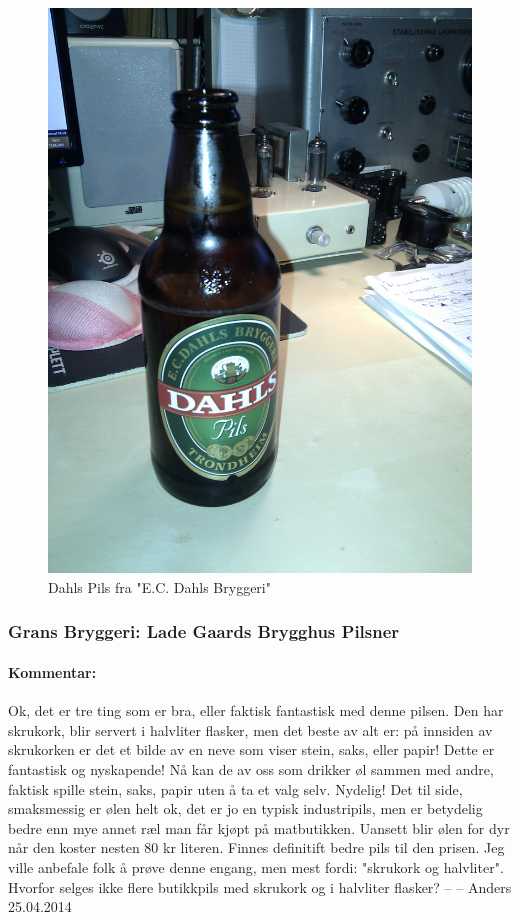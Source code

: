 \documentclass[12pt,a4paper,oneside,norsk]{article}
\begin{document}
\begin{figure} [H]
\centering
\includegraphics[scale=0.1, angle=0]{Bilder/Ol/dahls.jpg}
\caption{Dahls Pils fra "E.C. Dahls Bryggeri"}
\end{figure}

\newpage
\subsubsection{Grans Bryggeri: Lade Gaards Brygghus Pilsner}
\paragraph{Kommentar:}Ok, det er tre ting som er bra, eller faktisk fantastisk med denne pilsen. Den har skrukork, blir servert i halvliter flasker, men det beste av alt er: på innsiden av skrukorken er det et bilde av en neve som viser stein, saks, eller papir! Dette er fantastisk og nyskapende! Nå kan de av oss som drikker øl sammen med andre, faktisk spille stein, saks, papir uten å ta et valg selv. Nydelig! Det til side, smaksmessig er ølen helt ok, det er jo en typisk industripils, men er betydelig bedre enn mye annet ræl man får kjøpt på matbutikken. Uansett blir ølen for dyr når den koster nesten 80 kr literen. Finnes definitift bedre pils til den prisen. Jeg ville anbefale folk å prøve denne engang, men mest fordi: "skrukork og halvliter". Hvorfor selges ikke flere butikkpils med skrukork og i halvliter flasker?
\newline
-- -- Anders 25.04.2014
\end{document}
